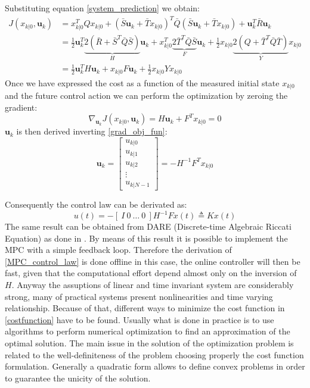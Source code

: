Substituting equation \ref{system_prediction} we obtain:
\begin{equation}
\begin{split} \label{costfunction_expr}
 J(x_{k|0},\textbf{u}_k)&=x_{k|0}^T Q x_{k|0} + (\bar{S}\textbf{u}_k+\bar{T}x_{k|0})^T\bar{Q}(\bar{S}\textbf{u}_k+\bar{T}x_{k|0}) + \textbf{u}_k^T\bar{R}\textbf{u}_k \\ 
 &= \frac{1}{2}\textbf{u}_k^T \underbrace{2(\bar{R}+\bar{S}^T\bar{Q}\bar{S})}_{H}\textbf{u}_k + x_{k|0}^T\underbrace{2\bar{T}^T\bar{Q}\bar{S}}_{F}\textbf{u}_k+\frac{1}{2}x_{k|0}\underbrace{2(Q+\bar{T}^T\bar{Q}\bar{T})}_{Y}x_{k|0} \\
 &=\frac{1}{2}\textbf{u}_k^TH\textbf{u}_k+x_{k|0}F\textbf{u}_k+\frac{1}{2}x_{k|0}Yx_{k|0}
 \end{split}
\end{equation}
Once we have expressed the cost as a function of the measured initial state $x_{k|0}$ and the future control action we can perform the optimization by zeroing the gradient:
\begin{equation}\label{grad_obj_fun}
	\nabla_{\textbf{u}_k}J(x_{k|0},\textbf{u}_k)=H\textbf{u}_k+F^Tx_{k|0}=0
\end{equation}
$\textbf{u}_k$ is then derived inverting \ref{grad_obj_fun}:
\begin{equation}\label{MPC_control_law}
	\textbf{u}_k= \left[
	\begin{matrix}
			u_{k|0} \\ u_{k|1} \\ u_{k|2} \\ \vdots \\ u_{k|N-1}
	\end{matrix}\right] = -H^{-1}F^Tx_{k|0}
\end{equation} 

Consequently the control law can be derivated as:
\begin{equation}
u(t)=-\left[\ I\ 0\ \dots\  0\ \right]H^{-1}Fx(t)\triangleq Kx(t)
\end{equation}
The same result can be obtained from DARE (Discrete-time Algebraic Riccati Equation) as done in \cite{magni2006complementi}.
By means of this result it is possible to implement the MPC with a simple feedback loop. Therefore the derivation of \ref{MPC_control_law} is done offline in this case, the online controller will then be fast, given that the computational effort depend almost only on the inversion of $H$. 
Anyway the assuptions of linear and time invariant system are considerably strong, many of practical systems present nonlinearities and time varying relationship. Because of that, different ways to minimize the cost function in \ref{costfunction} have to be found.
Usually what is done in practice is to use algorithms to perform numerical optimization to find an approximation of the optimal solution. The main issue in the solution of the optimization problem is related to the well-definiteness of the problem choosing properly the cost function formulation. Generally a quadratic form allows to define convex problems in order to guarantee the unicity of the solution.

